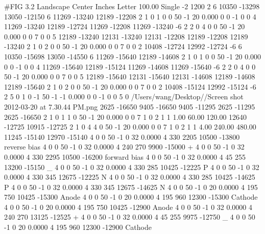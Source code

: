#FIG 3.2
Landscape
Center
Inches
Letter  
100.00
Single
-2
1200 2
6 10350 -13298 13050 -12150
6 11269 -13240 12189 -12208
2 1 0 1 0 0 50 -1 20 0.000 0 0 -1 0 0 4
	 11269 -13240 12189 -12724 11269 -12208 11269 -13240
-6
2 2 0 4 0 0 50 -1 20 0.000 0 0 7 0 0 5
	 12189 -13240 12131 -13240 12131 -12208 12189 -12208 12189 -13240
2 1 0 2 0 0 50 -1 20 0.000 0 0 7 0 0 2
	 10408 -12724 12992 -12724
-6
6 10350 -15698 13050 -14550
6 11269 -15640 12189 -14608
2 1 0 1 0 0 50 -1 20 0.000 0 0 -1 0 0 4
	 11269 -15640 12189 -15124 11269 -14608 11269 -15640
-6
2 2 0 4 0 0 50 -1 20 0.000 0 0 7 0 0 5
	 12189 -15640 12131 -15640 12131 -14608 12189 -14608 12189 -15640
2 1 0 2 0 0 50 -1 20 0.000 0 0 7 0 0 2
	 10408 -15124 12992 -15124
-6
2 5 0 1 0 -1 50 -1 -1 0.000 0 0 -1 0 0 5
	0 /Users/wang/Desktop//Screen shot 2012-03-20 at 7.30.44 PM.png
	 2625 -16650 9405 -16650 9405 -11295 2625 -11295 2625 -16650
2 1 0 1 1 0 50 -1 20 0.000 0 0 7 1 0 2
	1 1 1.00 60.00 120.00
	 12640 -12725 10915 -12725
2 1 0 4 4 0 50 -1 20 0.000 0 0 7 1 0 2
	1 1 4.00 240.00 480.00
	 11245 -15140 12970 -15140
4 0 0 50 -1 0 32 0.0000 4 330 2205 10500 -13800 reverse bias
4 0 0 50 -1 0 32 0.0000 4 240 270 9900 -15000 +
4 0 0 50 -1 0 32 0.0000 4 330 2295 10500 -16200 forward bias
4 0 0 50 -1 0 32 0.0000 4 45 255 13200 -15150 _
4 0 0 50 -1 0 32 0.0000 4 330 285 10425 -12225 P
4 0 0 50 -1 0 32 0.0000 4 330 345 12675 -12225 N
4 0 0 50 -1 0 32 0.0000 4 330 285 10425 -14625 P
4 0 0 50 -1 0 32 0.0000 4 330 345 12675 -14625 N
4 0 0 50 -1 0 20 0.0000 4 195 750 10425 -15300 Anode
4 0 0 50 -1 0 20 0.0000 4 195 960 12300 -15300 Cathode
4 0 0 50 -1 0 20 0.0000 4 195 750 10425 -12900 Anode
4 0 0 50 -1 0 32 0.0000 4 240 270 13125 -12525 +
4 0 0 50 -1 0 32 0.0000 4 45 255 9975 -12750 _
4 0 0 50 -1 0 20 0.0000 4 195 960 12300 -12900 Cathode

